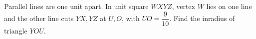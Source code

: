 Parallel lines are one unit apart. In unit square $WXYZ$, vertex $W$ lies on one line and the other line cuts $YX,YZ$ at $U,O$, with $UO=\dfrac{9}{10}$. Find the inradius of triangle $YOU$.
